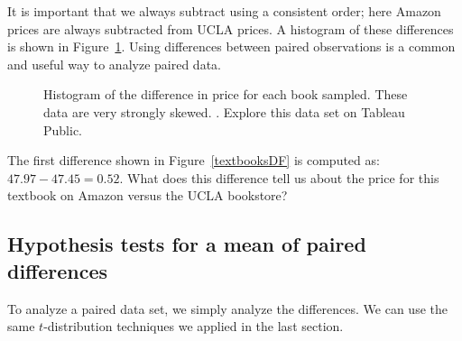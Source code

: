 It is important that we always subtract using
a consistent order;
here Amazon prices are always subtracted from UCLA prices.
A histogram of these differences is shown in
Figure~\ref{diffInTextbookPricesF18}.
Using differences between paired observations
is a common and useful way to analyze paired data.

\begin{figure}
\centering
{}
\caption{Histogram of the difference in price for
    each book sampled.
    These data are very strongly skewed.
    . Explore this data set on Tableau Public.}
\label{diffInTextbookPricesF18}
\end{figure}

\begin{exercisewrap}
\begin{nexercise}
The first difference shown in Figure~\ref{textbooksDF}
is computed as: $47.97 - 47.45 = 0.52$.
What does this difference tell us about the price for this textbook on Amazon versus the UCLA bookstore?\footnotemark
\end{nexercise}
\end{exercisewrap}


\subsection{Hypothesis tests for a mean of paired differences}

To analyze a paired data set,
we simply analyze the differences.
We can use the same $t$-distribution techniques
we applied in the last section.

